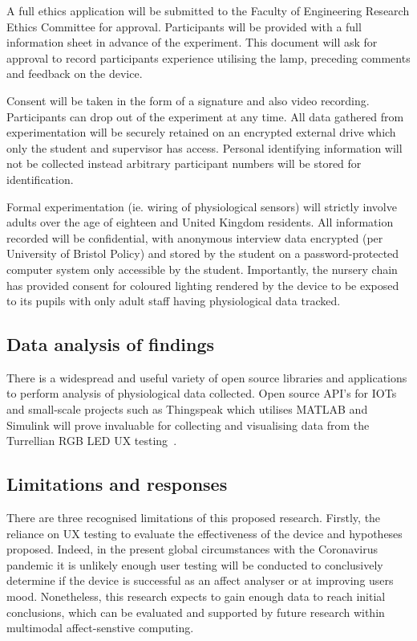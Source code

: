 \documentclass{sigchi}
\begin{document}
A full ethics application will be submitted to the Faculty of Engineering Research Ethics Committee for approval. Participants will be provided with a full information sheet in advance of the experiment. This document will ask for approval to record participants experience utilising the lamp, preceding comments and feedback on the device. 

Consent will be taken in the form of a signature and also video recording. Participants can drop out of the experiment at any time. All data gathered from experimentation will be securely retained on an encrypted external drive which only the student and supervisor has access. Personal identifying information will not be collected instead arbitrary participant numbers will be stored for identification. 

Formal experimentation (ie. wiring of physiological sensors) will strictly involve adults over the age of eighteen and United Kingdom residents. All information recorded will be confidential, with anonymous interview data encrypted (per University of Bristol Policy) and stored by the student on a password-protected computer system only accessible by the student. Importantly, the nursery chain has provided consent for coloured lighting rendered by the device to be exposed to its pupils with only adult staff having physiological data tracked. 

\subsection{Data analysis of findings}

There is a widespread and useful variety of open source libraries and applications to perform analysis of physiological data collected. Open source API’s for IOTs and small-scale projects such as Thingspeak which utilises MATLAB and Simulink will prove invaluable for collecting and visualising data from the Turrellian RGB LED UX testing~\cite{Thingspeak01}.

\subsection{Limitations and responses}

There are three recognised limitations of this proposed research. Firstly, the reliance on UX testing to evaluate the effectiveness of the device and hypotheses proposed. Indeed, in the present global circumstances with the Coronavirus pandemic it is unlikely enough user testing will be conducted to conclusively determine if the device is successful as an affect analyser or at improving users mood. Nonetheless, this research expects to gain enough data to reach initial conclusions, which can be evaluated and supported by future research within multimodal affect-senstive computing. 
\end{document}
